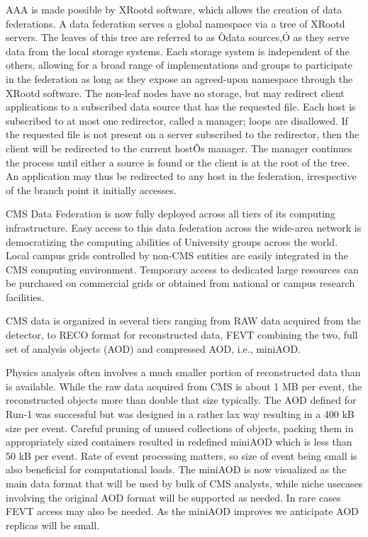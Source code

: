 \documentclass[11pt,a4paper]{article}
\begin{document}
AAA is made possible by XRootd software, which allows the creation of
data federations. A data federation serves a global namespace via a
tree of XRootd servers. The leaves of this tree are referred to as
Òdata sources,Ó as they serve data from the local storage systems.
Each storage system is independent of the others, allowing for a broad
range of implementations and groups to participate in the federation
as long as they expose an agreed-upon namespace through the XRootd
software. The non-leaf nodes have no storage, but may redirect client
applications to a subscribed data source that has the requested file.
Each host is subscribed to at most one redirector, called a manager;
loops are disallowed. If the requested file is not present on a server
subscribed to the redirector, then the client will be redirected to
the current hostÕs manager.  The manager continues the process until
either a source is found or the client is at the root of the tree. An
application may thus be redirected to any host in the federation,
irrespective of the branch point it initially accesses.

CMS Data Federation is now fully deployed across all tiers of its
computing infrastructure. Easy access to this data federation across
the wide-area network is democratizing the computing abilities of
University groups across the world. Local campus grids controlled by
non-CMS entities are easily integrated in the CMS computing
environment. Temporary access to dedicated large resources can be
purchased on commercial grids or obtained from national or campus
research facilities.


CMS data is organized in several tiers ranging from RAW data acquired
from the detector, to RECO format for reconstructed data, FEVT
combining the two, full set of analysis objects (AOD) and compressed
AOD, i.e., miniAOD.

Physics analysis often involves a much smaller portion of
reconstructed data than is available. While the raw data acquired from
CMS is about 1 MB per event, the reconstructed objects more than
double that size typically. The AOD defined for Run-1 was successful
but was designed in a rather lax way resulting in a 400 kB size per
event. Careful pruning of unused collections of objects, packing them
in appropriately sized containers resulted in redefined miniAOD which
is less than 50 kB per event. Rate of event processing matters, so
size of event being small is also beneficial for computational
loads. The miniAOD is now visualized as the main data format that will
be used by bulk of CMS analysts, while niche usecases involving the
original AOD format will be supported as needed. In rare cases FEVT
access may also be needed.  As the miniAOD improves we anticipate AOD
replicas will be small.
\end{document}
